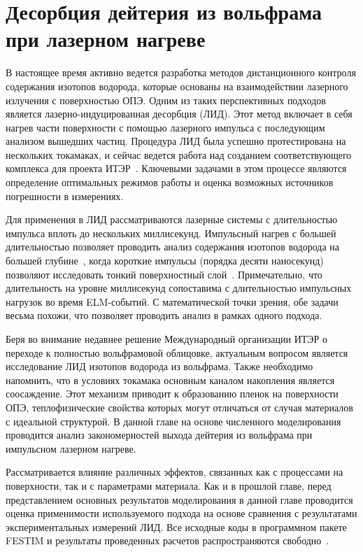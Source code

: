 \chapter{Десорбция дейтерия из вольфрама при лазерном нагреве}\label{ch:ch4}

В настоящее время активно ведется разработка методов дистанционного контроля содержания изотопов водорода, которые основаны на взаимодействии лазерного излучения с поверхностью ОПЭ. Одним из таких перспективных подходов является лазерно-индуцированная десорбция (ЛИД). Этот метод включает в себя нагрев части поверхности с помощью лазерного импульса с последующим анализом вышедших частиц. Процедура ЛИД была успешно протестирована на нескольких токамаках, и сейчас ведется работа над созданием соответствующего комплекса для проекта ИТЭР~\cite{Zlobinski2024}. Ключевыми задачами в этом процессе являются определение оптимальных режимов работы и оценка возможных источников погрешности в измерениях.

Для применения в ЛИД рассматриваются лазерные системы с длительностью импульса вплоть до нескольких миллисекунд. Импульсный нагрев с большей длительностью позволяет проводить анализ содержания изотопов водорода на большей глубине~\cite{Yu2019, Zlobinski2020}, когда короткие импульсы (порядка десяти наносекунд) позволяют исследовать тонкий поверхностный слой~\cite{Gasparyan2021}. Примечательно, что длительность на уровне миллисекунд сопоставима с длительностью импульсных нагрузок во время ELM-событий. С математической точки зрения, обе задачи весьма похожи, что позволяет проводить анализ в рамках одного подхода.

Беря во внимание недавнее решение Международный организации ИТЭР о переходе к полностью вольфрамовой облицовке, актуальным вопросом является исследование ЛИД изотопов водорода из вольфрама. Также необходимо напомнить, что в условиях токамака основным каналом накопления является соосаждение. Этот механизм приводит к образованию пленок на поверхности ОПЭ, теплофизические свойства которых могут отличаться от случая материалов с идеальной структурой. В данной главе на основе численного моделирования проводится анализ закономерностей выхода дейтерия из вольфрама при импульсном лазерном нагреве.

Рассматривается влияние различных эффектов, связанных как с процессами на поверхности, так и с параметрами материала. Как и в прошлой главе, перед представлением основных результатов моделирования в данной главе проводится оценка применимости используемого подхода на основе сравнения с результатами экспериментальных измерений ЛИД. Все исходные коды в программном пакете FESTIM и результаты проведенных расчетов распространяются свободно~\cite{Kulagin_PhD_2025}.

